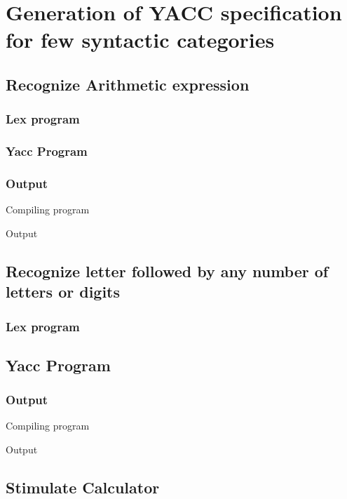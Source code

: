 \section{Generation of YACC specification for few syntactic categories}
\subsection{Recognize Arithmetic expression}
\subsubsection{Lex program}

\subsubsection{Yacc Program}

\subsubsection{Output}
Compiling program



\vspace{0.5cm}
Output



\subsection{Recognize letter followed by any number of letters or digits}
\subsubsection{Lex program}

\subsection{Yacc Program}

\subsubsection{Output}
Compiling program



\vspace{0.5cm}
Output


\subsection{Stimulate Calculator}
